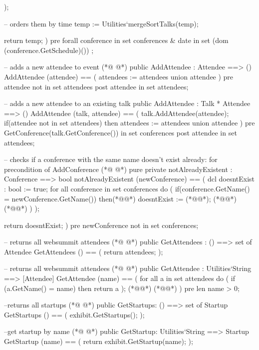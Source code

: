 \begin{vdmpp}[breaklines=true]
     );
     
     -- orders them by time
    temp := Utilities`mergeSortTalks(temp);
          
     return temp;
    )
    pre forall conference in set conferences & date in set (dom (conference.GetSchedule)()) ;   
    
  -- adds a new attendee to event
(*@
\label{AddAttendee:209}
@*)
  public AddAttendee : Attendee ==> ()
    AddAttendee (attendee) == (
     attendees := attendees union {attendee}
    )
    pre attendee not in set attendees
    post attendee in set attendees;   
    
  -- adds a new attendee to an existing talk
  public AddAttendee : Talk * Attendee ==> ()
    AddAttendee (talk, attendee) == (
     talk.AddAttendee(attendee);
     if(attendee not in set attendees)
      then attendees := attendees union {attendee}
    )
    pre GetConference(talk.GetConference()) in set conferences
    post attendee in set attendees; 
  
  -- checks if a conference with the same name doesn't exist already: for precondition of AddConference
(*@
\label{notAlreadyExistent:227}
@*)
    pure private notAlreadyExistent : Conference ==> bool
    notAlreadyExistent (newConference) == (
    dcl doesntExist : bool := true;
    for all conference in set conferences do (
     if(conference.GetName() = newConference.GetName())
     then(*@\vdmnotcovered{(}@*)
        doesntExist := (*@@*);
        (*@@*) (*@@*)
       )
     );
     
     return doesntExist;
    )
    pre newConference not in set conferences;
    
  -- returns all websummit attendees
(*@
\label{GetAttendees:243}
@*)
  public GetAttendees : () ==> set of Attendee
    GetAttendees () == (
     return attendees;
    );  
    
   -- returns all websummit attendees
(*@
\label{GetAttendee:249}
@*)
   public GetAttendee : Utilities`String ==> [Attendee]
    GetAttendee (name) == (
     for all a in set attendees do (
     if (a.GetName() = name)
      then return a
     );
     (*@@*) (*@@*)
    )
    pre len name > 0; 
 
  --returns all startups
(*@
\label{GetStartups:260}
@*)
  public GetStartups: () ==> set of Startup
    GetStartups () == (
     exhibit.GetStartups();
    );
    
   --get startup by name   
(*@
\label{GetStartup:266}
@*)
  public GetStartup: Utilities`String ==> Startup
    GetStartup (name) == (
     return exhibit.GetStartup(name);
    );
 

\end{vdmpp}
